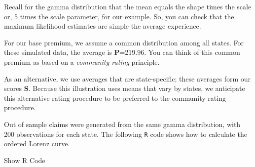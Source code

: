\documentclass[]{book}
\theoremstyle{definition}
\theoremstyle{definition}
\theoremstyle{definition}
\theoremstyle{remark}
\begin{document}
Recall for the gamma distribution that the mean equals the shape times
the scale or, 5 times the scale parameter, for our example. So, you can
check that the maximum likelihood estimates are simple the average
experience.

For our base premium, we assume a common distribution among all states.
For these simulated data, the average is \textbf{P}=219.96. You can
think of this common premium as based on a \emph{community rating}
principle.

As an alternative, we use averages that are state-specific; these
averages form our scores \textbf{S}. Because this illustration uses
means that vary by states, we anticipate this alternative rating
procedure to be preferred to the community rating procedure.

Out of sample claims were generated from the same gamma distribution,
with 200 observations for each state. The following \texttt{R} code
shows how to calculate the ordered Lorenz curve.

Show R Code
\end{document}
